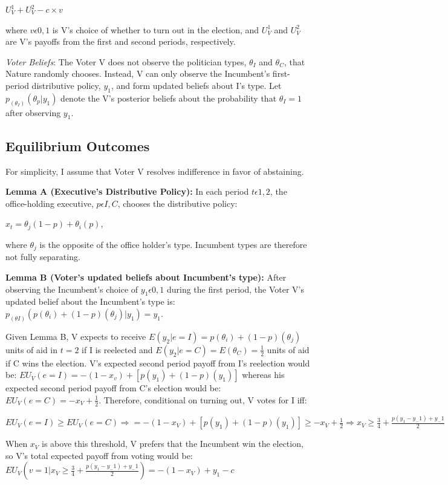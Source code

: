 \documentclass[12pt]{paper}
\begin{document}
$U_{V}^1 + U_{V}^2 - c \times v$

where $v\epsilon{0,1}$ is V’s choice of whether to turn out in the election, and $U_{V}^1$ and $U_{V}^2$ are V’s payoffs from the first and second periods, respectively.

\emph{Voter Beliefs}: The Voter V does not observe the politician types, $\theta_I$ and $\theta_C$, that Nature randomly chooses. Instead, V can only observe the Incumbent's first-period distributive policy,  $y_1$, and form updated beliefs about I’s type. Let $p_(\theta_I ) (\theta_p | y_1 )$ denote the V’s posterior beliefs about the probability that $\theta_I=1$ after observing $y_1$.

\subsection{Equilibrium Outcomes}
	For simplicity, I assume that Voter V resolves indifference in favor of abstaining.
	
\textbf{Lemma A (Executive’s Distributive Policy):} In each period $t\epsilon{1,2}$, the office-holding executive, $p\epsilon{I,C}$, chooses the distributive policy: 

$x_t=\theta_j (1-p)+ \theta_i (p)$, 

where $\theta_j$ is the opposite of the office holder’s type. Incumbent types are therefore not fully separating. 


\textbf{Lemma B (Voter’s updated beliefs about Incumbent’s type):}  After observing the Incumbent’s choice of $y_1 \epsilon {0,1}$ during the first period, the Voter V’s updated belief about the Incumbent’s type is: $p_(\theta I) (p(\theta_i ) + (1 - p)(\theta_j ) | y_1 )=y_1$.

Given Lemma B, V expects to receive $E(y_2 | e=I)=p(\theta_i )+(1-p)(\theta_j)$ units of aid in $t=2$ if I is reelected and $E(y_2 |e=C)=E(\theta_C )=\frac{1}{2}$ units of aid if C wins the election.  V’s expected second period payoff from I’s reelection would be: $EU_V (e=I) = -(1 - x_v ) + [p(y_1 ) + (1 - p)(y_1 )]$ whereas his expected second period payoff from C’s election would be: $EU_V (e=C) = - x_V + \frac{1}{2}$. Therefore, conditional on turning out, V votes for I iff: 

$EU_V (e=I) \geq EU_V (e=C) \Rightarrow = -(1 - x_V ) + [p(y_1 ) + (1 - p)(y_1 )] \geq - x_V + \frac{1}{2} \Rightarrow x_V \geq \frac{3}{4} + \frac{p(y_1 - y_-1 ) + y_-1}{2}$

When $x_V$ is above this threshold, V prefers that the Incumbent win the election, so V’s total expected payoff from voting would be:
$ EU_V (v=1 | x_V \geq \frac{3}{4} + \frac{p(y_1 - y_-1 ) + y_-1}{2}) = - (1 - x_V ) + y_1 - c$
\end{document}
